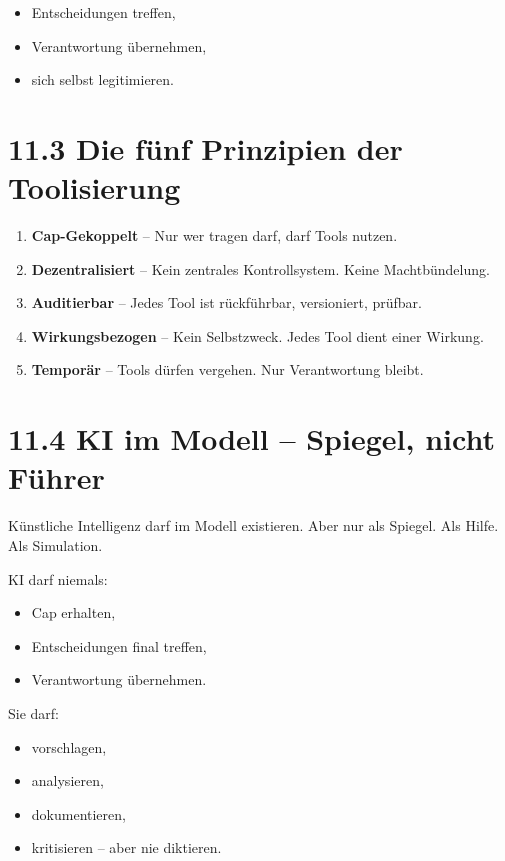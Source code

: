 \documentclass[12pt,a4paper]{book}
\begin{document}
\begin{itemize}
    \item Entscheidungen treffen,
    \item Verantwortung übernehmen,
    \item sich selbst legitimieren.
\end{itemize}

\section*{11.3 Die fünf Prinzipien der Toolisierung}

\begin{enumerate}
    \item \textbf{Cap-Gekoppelt} – Nur wer tragen darf, darf Tools nutzen.
    \item \textbf{Dezentralisiert} – Kein zentrales Kontrollsystem. Keine Machtbündelung.
    \item \textbf{Auditierbar} – Jedes Tool ist rückführbar, versioniert, prüfbar.
    \item \textbf{Wirkungsbezogen} – Kein Selbstzweck. Jedes Tool dient einer Wirkung.
    \item \textbf{Temporär} – Tools dürfen vergehen. Nur Verantwortung bleibt.
\end{enumerate}

\section*{11.4 KI im Modell – Spiegel, nicht Führer}

Künstliche Intelligenz darf im Modell existieren.  
Aber nur als Spiegel. Als Hilfe. Als Simulation.

KI darf niemals:

\begin{itemize}
    \item Cap erhalten,
    \item Entscheidungen final treffen,
    \item Verantwortung übernehmen.
\end{itemize}

Sie darf:

\begin{itemize}
    \item vorschlagen,
    \item analysieren,
    \item dokumentieren,
    \item kritisieren – aber nie diktieren.
\end{itemize}
\end{document}
